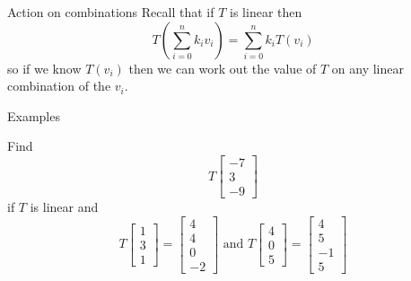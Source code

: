 \documentclass{beamer}
\begin{document}
\begin{frame}{Action on combinations}
Recall that if $T$ is linear then
\begin{equation*}
T\left(\sum_{i=0}^n k_i v_i\right) = \sum_{i=0}^n k_i T(v_i)
\end{equation*}
so if we know $T(v_i)$ then we can work out the value of $T$ on any linear combination of the $v_i$.
\end{frame}

\begin{frame}{Examples}
\begin{example}
	Find
	\begin{equation*}
	T \left[
	\begin{array}{c}
	-7\\
	3\\
	-9
	\end{array}
	\right]
	\end{equation*}
	if $T$ is linear and
	\begin{equation*}
	T \left[
	\begin{array}{c}
	1\\
	3\\
	1
	\end{array}
	\right] = \left[
	\begin{array}{c}
	4\\
	4\\
	0\\
	-2
	\end{array}
	\right]\text{ and } T \left[
	\begin{array}{c}
	4\\
	0\\
	5
	\end{array}
	\right] = \left[
	\begin{array}{c}
	4\\
	5\\
	-1\\
	5
	\end{array}
	\right]
	\end{equation*}
\end{example}
\end{frame}
\end{document}
